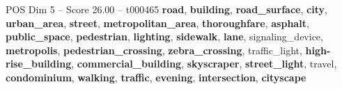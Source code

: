 \begin{textsample}{POS Dim 5 – Score 26.00 – t000465}  \label{ex:f5_pos_004}
\textbf{road}, \textbf{building}, \textbf{road\_surface}, \textbf{city}, \textbf{urban\_area}, \textbf{street}, \textbf{metropolitan\_area}, \textbf{thoroughfare}, \textbf{asphalt}, \textbf{public\_space}, \textbf{pedestrian}, \textbf{lighting}, \textbf{sidewalk}, \textbf{lane}, signaling\_device, \textbf{metropolis}, \textbf{pedestrian\_crossing}, \textbf{zebra\_crossing}, traffic\_light, \textbf{high-rise\_building}, \textbf{commercial\_building}, \textbf{skyscraper}, \textbf{street\_light}, travel, \textbf{condominium}, \textbf{walking}, \textbf{traffic}, \textbf{evening}, \textbf{intersection}, \textbf{cityscape}

\end{textsample}
